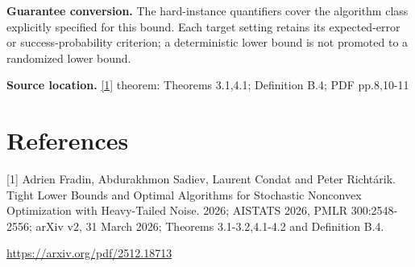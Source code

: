 \documentclass[10pt,a4paper]{article}
\begin{document}
\textbf{Guarantee conversion.} The hard-instance quantifiers cover the algorithm class explicitly specified for this bound. Each target setting retains its expected-error or success-probability criterion; a deterministic lower bound is not promoted to a randomized lower bound.

\textbf{Source location.} \href{https://arxiv.org/pdf/2512.18713}{[1]} theorem: Theorems 3.1,4.1; Definition B.4; PDF pp.8,10-11

\section{References}
[1] Adrien Fradin, Abdurakhmon Sadiev, Laurent Condat and Peter Richtárik. Tight Lower Bounds and Optimal Algorithms for Stochastic Nonconvex Optimization with Heavy-Tailed Noise. 2026; AISTATS 2026, PMLR 300:2548-2556; arXiv v2, 31 March 2026; Theorems 3.1-3.2,4.1-4.2 and Definition B.4.

\url{https://arxiv.org/pdf/2512.18713}
\end{document}
